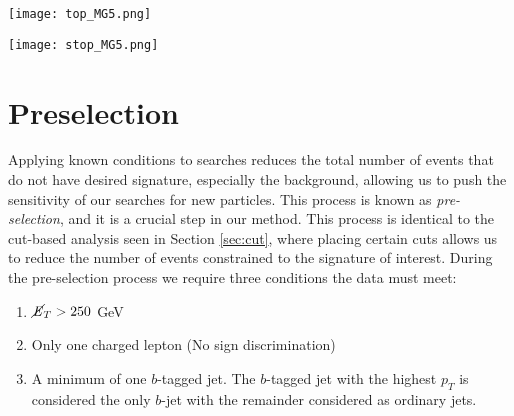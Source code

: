 \noindent\begin{minipage}{\textwidth}
\centering
  \begin{minipage}[htbp]{0.45\textwidth}
    \centering
    \texttt{[image: top\_MG5.png]}
    \label{fig:bkrdFeyn}
  \end{minipage}
  \hfill
  \begin{minipage}[htbp]{0.45\textwidth}
    \centering
    \texttt{[image: stop\_MG5.png]}
    \label{fig:sigFeyn}
  \end{minipage}
\end{minipage}
\section{Preselection}
Applying known conditions to searches reduces the total number of events that do not have desired signature, especially the background, allowing us to push the sensitivity of our searches for new particles. This process is known as \textit{pre-selection}, and it is a crucial step in our method. This process is identical to the cut-based analysis seen in Section \ref{sec:cut}, where placing certain cuts allows us to reduce the number of events constrained to the signature of interest. During the pre-selection process we require three conditions the data must meet: 
\begin{enumerate}
    \item $\cancel{\it{E}}_{T}>250$ GeV
    \item Only one charged lepton (No sign discrimination)
    \item A minimum of one $b$-tagged jet. The $b$-tagged jet with the highest $p_T$ is considered the only $b$-jet with the remainder considered as ordinary jets.
\end{enumerate}

